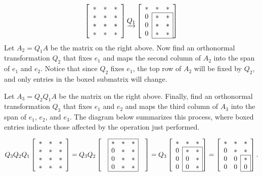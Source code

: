\begin{equation*}
\left[\begin{array}{ccc}
* & * & * \\
* & * & * \\
* & * & * \\
* & * & *
\end{array}\right]
\underrightarrow{Q_1}
\left[\begin{array}{ccc}
    *  & * &     *  \\
\cline{2-3}
\rvl{0} & * & \rvl{*} \\
\rvl{0} & * & \rvl{*} \\
\rvl{0} & * & \rvl{*} \\
\cline{2-3}
\end{array}\right]
\end{equation*}
Let $A_2 = Q_1A$ be the matrix on the right above.
Now find an orthonormal transformation $Q_2$ that fixes $e_1$ and maps the second column of $A_2$ into the span of $e_1$ and $e_2$.
Notice that since $Q_2$ fixes $e_1$, the top row of $A_2$ will be fixed by $Q_2$, and only entries in the boxed submatrix will change.

Let $A_3 = Q_2Q_1A$ be the matrix on the right above.
Finally, find an orthonormal transformation $Q_3$ that fixes $e_1$ and $e_2$ and maps the third column of $A_3$ into the span of $e_1$, $e_2$, and $e_3$.
The diagram below summarizes this process, where boxed entries indicate those affected by the operation just performed.

\begin{equation*}
Q_3 Q_2 Q_1
\left[\begin{array}{ccc}
* & * & * \\
* & * & * \\
* & * & * \\
* & * & *
\end{array}\right]
= Q_3 Q_2
\left[\begin{array}{ccccc}
\cline{2-4}
& \lvl{*} & * & \rvl{*} & \\
& \lvl{0} & * & \rvl{*}& \\
& \lvl{0} & * & \rvl{*} & \\
& \lvl{0} & * & \rvl{*} & \\ \cline{2-4}
\end{array}\right]
= Q_3
\left[\begin{array}{ccc}
     *  & * &      * \\
\cline{2-3}
\rvl{0} & * & \rvl{*} \\
\rvl{0} & 0 & \rvl{*} \\
\rvl{0} & 0 & \rvl{*} \\
\cline{2-3}
\end{array}\right]
=
\left[\begin{array}{ccc}
* & * & * \\
0 & * & * \\
\cline{3-3}
0 & \rvl{0} & \rvl{*} \\
0 & \rvl{0} & \rvl{0} \\
\cline{3-3}
\end{array}\right].
\end{equation*}

